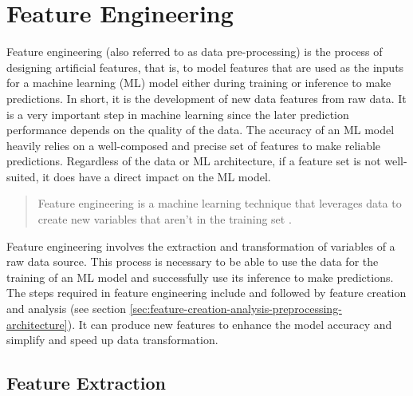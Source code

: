   



\section{Feature Engineering}
\label{sec:feature-engineering-data-preprocessing-architecture}

  Feature engineering (also referred to as data pre-processing) is the process of designing artificial features, that is, to model features that are used as the inputs for a machine learning (ML) model either during training or inference to make predictions. In short, it is the development of new data features from raw data.
  It is a very important step in machine learning since the later prediction performance depends on the quality of the data.
  The accuracy of an ML model heavily relies on a well-composed and precise set of features to make reliable predictions. Regardless of the data or ML architecture, if a feature set is not well-suited, it does have a direct impact on the ML model.
  \begin{quote}
    Feature engineering is a machine learning technique that leverages data to create new variables that aren't in the training set \cite{patelWhatFeatureEngineering2021}.
  \end{quote}
  Feature engineering involves the extraction and transformation of variables of a raw data source. This process is necessary to be able to use the data for the training of an ML model and successfully use its inference to make predictions.
  The steps required in feature engineering include  and  followed by feature creation and analysis (see section \ref{sec:feature-creation-analysis-preprocessing-architecture}).
  It can produce new features to enhance the model accuracy and simplify and speed up data transformation.

  \subsection{Feature Extraction}
  \label{sec:feature-extraction-preprocessing-architecture}

